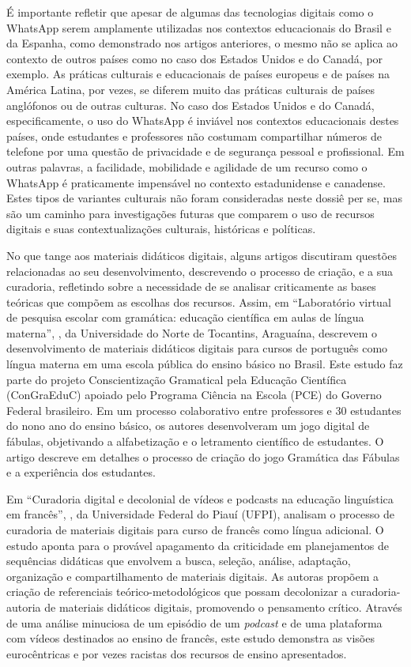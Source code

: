 \documentclass[portuguese]{textolivre}
\begin{document}
É importante refletir que apesar de algumas das tecnologias digitais como o WhatsApp serem amplamente utilizadas nos contextos educacionais do Brasil e da Espanha, como demonstrado nos artigos anteriores, o mesmo não se aplica ao contexto de outros países como no caso dos Estados Unidos e do Canadá, por exemplo. As práticas culturais e educacionais de países europeus e de países na América Latina, por vezes, se diferem muito das práticas culturais de países anglófonos ou de outras culturas. No caso dos Estados Unidos e do Canadá, especificamente, o uso do WhatsApp é inviável nos contextos educacionais destes países, onde estudantes e professores não costumam compartilhar  números de telefone por uma questão de privacidade e de segurança pessoal e profissional. Em outras palavras, a facilidade, mobilidade e agilidade de um recurso como o WhatsApp é praticamente impensável no contexto estadunidense e canadense. Estes tipos de variantes culturais não foram consideradas neste dossiê per se, mas são um caminho para investigações futuras que comparem o uso de recursos digitais e suas contextualizações culturais, históricas e políticas.

No que tange aos materiais didáticos digitais, alguns artigos discutiram questões relacionadas ao seu desenvolvimento, descrevendo o processo de criação, e a sua curadoria, refletindo sobre a necessidade de se analisar criticamente as bases teóricas que compõem as escolhas dos recursos. Assim, em “Laboratório virtual de pesquisa escolar com gramática: educação científica em aulas de língua materna”, \textcite{silva_densidade_2024}, da Universidade do Norte de Tocantins, Araguaína, descrevem o desenvolvimento de materiais didáticos digitais para cursos de português como língua materna em uma escola pública do ensino básico no Brasil. Este estudo faz parte do projeto Conscientização Gramatical pela Educação Científica (ConGraEduC) apoiado pelo Programa Ciência na Escola (PCE) do Governo Federal brasileiro. Em um processo colaborativo entre professores e 30 estudantes do nono ano do ensino básico, os autores desenvolveram um jogo digital de fábulas, objetivando a alfabetização e o letramento científico de estudantes. O artigo descreve em detalhes o processo de criação do jogo Gramática das Fábulas e a experiência dos estudantes. 

Em “Curadoria digital e decolonial de vídeos e podcasts na educação linguística em francês”, \textcite{abreu_curadoria_2024}, da Universidade Federal do Piauí (UFPI), analisam o processo de curadoria de materiais digitais para curso de francês como língua adicional. O estudo aponta para o provável apagamento da criticidade em planejamentos de sequências didáticas que envolvem a busca, seleção, análise, adaptação, organização e compartilhamento de materiais digitais. As autoras propõem a criação de referenciais teórico-metodológicos que possam decolonizar a curadoria-autoria de materiais didáticos digitais, promovendo o pensamento crítico. Através de uma análise minuciosa de um episódio de um \textit{podcast} e de uma plataforma com vídeos destinados ao ensino de francês, este estudo demonstra as visões eurocêntricas e por vezes racistas dos recursos de ensino apresentados.
\end{document}

